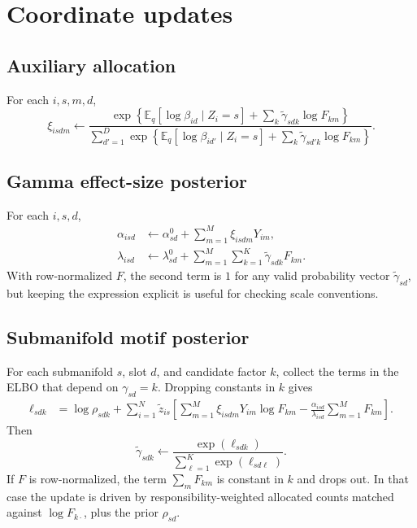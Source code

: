 \documentclass[11pt]{article}
\newcommand{\E}{\mathbb{E}}
\newcommand{\tg}{\widetilde{\gamma}}
\newcommand{\tz}{\widetilde{z}}
\theoremstyle{definition}
\begin{document}
\section{Coordinate updates}

\subsection{Auxiliary allocation}

For each $i,s,m,d$,
\[
  \xi_{isdm}
  \leftarrow
  \frac{
    \exp\left\{
      \E_q[\log\beta_{id}\mid Z_i=s]
      +
      \sum_k \tg_{sdk}\log F_{km}
    \right\}
  }{
    \sum_{d'=1}^{D}
    \exp\left\{
      \E_q[\log\beta_{id'}\mid Z_i=s]
      +
      \sum_k \tg_{sd'k}\log F_{km}
    \right\}
  }.
\]

\subsection{Gamma effect-size posterior}

For each $i,s,d$,
\begin{align}
  \alpha_{isd}
    &\leftarrow
    \alpha^0_{sd}
    +
    \sum_{m=1}^{M}\xi_{isdm}Y_{im}, \\
  \lambda_{isd}
    &\leftarrow
    \lambda^0_{sd}
    +
    \sum_{m=1}^{M}\sum_{k=1}^{K}\tg_{sdk}F_{km}.
\end{align}
With row-normalized $F$, the second term is $1$ for any valid probability
vector $\tg_{sd}$, but keeping the expression explicit is useful for checking
scale conventions.

\subsection{Submanifold motif posterior}

For each submanifold $s$, slot $d$, and candidate factor $k$, collect the terms
in the ELBO that depend on $\gamma_{sd}=k$. Dropping constants in $k$ gives
\begin{align}
  \ell_{sdk}
  &=
  \log \rho_{sdk}
  +
  \sum_{i=1}^{N}\tz_{is}
  \left[
    \sum_{m=1}^{M}
      \xi_{isdm}Y_{im}\log F_{km}
    -
    \frac{\alpha_{isd}}{\lambda_{isd}}
    \sum_{m=1}^{M}F_{km}
  \right].
\end{align}
Then
\[
  \tg_{sdk}
  \leftarrow
  \frac{\exp(\ell_{sdk})}
       {\sum_{\ell=1}^{K}\exp(\ell_{sd\ell})}.
\]
If $F$ is row-normalized, the term
$\sum_m F_{km}$ is constant in $k$ and drops out. In that case the update is
driven by responsibility-weighted allocated counts matched against
$\log F_{k\cdot}$, plus the prior $\rho_{sd}$.
\end{document}
